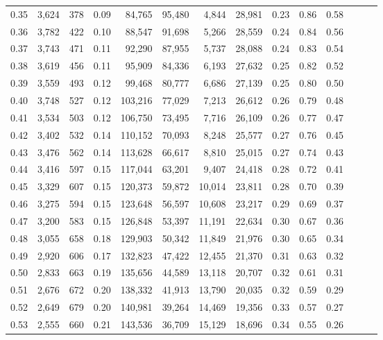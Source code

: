 \begin{tabular}{rrrrrrrrrrrrrr}
0.35 &  3,624 &  378 &  0.09 &   84,765 &   95,480 &   4,844 &  28,981 &  0.23 &  0.86 &      0.58 \\
0.36 &  3,782 &  422 &  0.10 &   88,547 &   91,698 &   5,266 &  28,559 &  0.24 &  0.84 &      0.56 \\
0.37 &  3,743 &  471 &  0.11 &   92,290 &   87,955 &   5,737 &  28,088 &  0.24 &  0.83 &      0.54 \\
0.38 &  3,619 &  456 &  0.11 &   95,909 &   84,336 &   6,193 &  27,632 &  0.25 &  0.82 &      0.52 \\
0.39 &  3,559 &  493 &  0.12 &   99,468 &   80,777 &   6,686 &  27,139 &  0.25 &  0.80 &      0.50 \\
0.40 &  3,748 &  527 &  0.12 &  103,216 &   77,029 &   7,213 &  26,612 &  0.26 &  0.79 &      0.48 \\
0.41 &  3,534 &  503 &  0.12 &  106,750 &   73,495 &   7,716 &  26,109 &  0.26 &  0.77 &      0.47 \\
0.42 &  3,402 &  532 &  0.14 &  110,152 &   70,093 &   8,248 &  25,577 &  0.27 &  0.76 &      0.45 \\
0.43 &  3,476 &  562 &  0.14 &  113,628 &   66,617 &   8,810 &  25,015 &  0.27 &  0.74 &      0.43 \\
0.44 &  3,416 &  597 &  0.15 &  117,044 &   63,201 &   9,407 &  24,418 &  0.28 &  0.72 &      0.41 \\
0.45 &  3,329 &  607 &  0.15 &  120,373 &   59,872 &  10,014 &  23,811 &  0.28 &  0.70 &      0.39 \\
0.46 &  3,275 &  594 &  0.15 &  123,648 &   56,597 &  10,608 &  23,217 &  0.29 &  0.69 &      0.37 \\
0.47 &  3,200 &  583 &  0.15 &  126,848 &   53,397 &  11,191 &  22,634 &  0.30 &  0.67 &      0.36 \\
0.48 &  3,055 &  658 &  0.18 &  129,903 &   50,342 &  11,849 &  21,976 &  0.30 &  0.65 &      0.34 \\
0.49 &  2,920 &  606 &  0.17 &  132,823 &   47,422 &  12,455 &  21,370 &  0.31 &  0.63 &      0.32 \\
0.50 &  2,833 &  663 &  0.19 &  135,656 &   44,589 &  13,118 &  20,707 &  0.32 &  0.61 &      0.31 \\
0.51 &  2,676 &  672 &  0.20 &  138,332 &   41,913 &  13,790 &  20,035 &  0.32 &  0.59 &      0.29 \\
0.52 &  2,649 &  679 &  0.20 &  140,981 &   39,264 &  14,469 &  19,356 &  0.33 &  0.57 &      0.27 \\
0.53 &  2,555 &  660 &  0.21 &  143,536 &   36,709 &  15,129 &  18,696 &  0.34 &  0.55 &      0.26 \\

\end{tabular}
